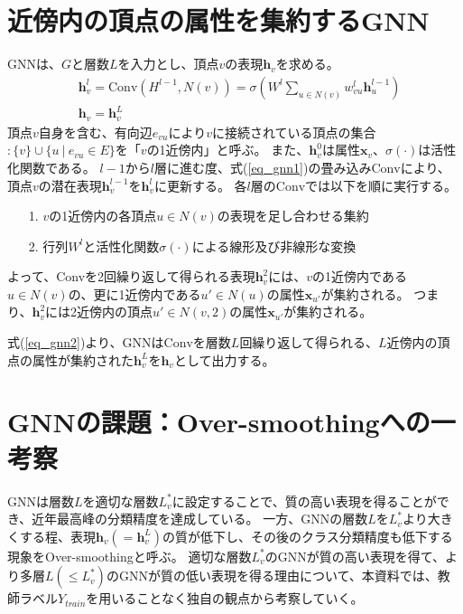 \documentclass[a4j,twocolumn]{jsarticle}
\begin{document}
\section{近傍内の頂点の属性を集約するGNN}
\label{sec_gnn}

GNNは、$G$と層数$L$を入力とし、頂点$v$の表現$\bm{h}_v$を求める。
\begin{align}
  & \bm{h}_v^l = \text{Conv}(H^{l-1}, N(v)) = \sigma\left( W^l \sum_{u\in N(v)} w_{vu}^l\bm{h}_u^{l-1} \right) \label{eq_gnn1} \\
  & \bm{h}_v   = \bm{h}_v^L \label{eq_gnn2}
\end{align}
頂点$v$自身を含む、有向辺$e_{vu}$により$v$に接続されている頂点の集合$:\{v\} \cup \{u ~|~ e_{vu} \in E\}$を「$v$の1近傍内」と呼ぶ。
また、$\bm{h}_v^0$は属性$\bm{x}_v$、$\sigma(\cdot)$は活性化関数である。
$l-1$から$l$層に進む度、式(\ref{eq_gnn1})の畳み込み$\text{Conv}$により、頂点$v$の潜在表現$\bm{h}_v^{l-1}$を$\bm{h}_v^{l}$に更新する。
各$l$層の$\text{Conv}$では以下を順に実行する。\vspace{-1mm}
\begin{itemize}
  \item[1.] $v$の1近傍内の各頂点$u\in N(v)$の表現を足し合わせる集約\vspace{+1mm}
  \item[2.] 行列$W^l$と活性化関数$\sigma(\cdot)$による線形及び非線形な変換\vspace{-1mm}
\end{itemize}
よって、Convを2回繰り返して得られる表現$\bm{h}_v^2$には、$v$の1近傍内である$u\in N(v)$の、更に1近傍内である$u' \in N(u)$の属性$\bm{x}_{u'}$が集約される。
つまり、$\bm{h}_v^2$には2近傍内の頂点$u' \in N(v,2)$の属性$\bm{x}_{u'}$が集約される。

式(\ref{eq_gnn2})より、GNNは$\text{Conv}$を層数$L$回繰り返して得られる、$L$近傍内の頂点の属性が集約された$\bm{h}_v^L$を$\bm{h}_v$として出力する。



\section{GNNの課題：Over-smoothingへの一考察}
\label{sec_oversmoothing}

GNNは層数$L$を適切な層数$L_v^*$に設定することで、質の高い表現を得ることができ、近年最高峰の分類精度を達成している。
一方、GNNの層数$L$を$L_v^*$より大きくする程、表現$\bm{h}_v(=\bm{h}_v^L)$の質が低下し、その後のクラス分類精度も低下する現象をOver-smoothingと呼ぶ。
適切な層数$L_v^*$のGNNが質の高い表現を得て、より多層$L(\le L_v^*)$のGNNが質の低い表現を得る理由について、本資料では、教師ラベル$Y_{train}$を用いることなく独自の観点から考察していく。
\end{document}
